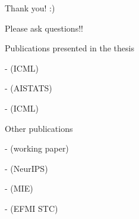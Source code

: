 \documentclass[17pt,aspectratio=169]{beamer}
\begin{document}
\begin{frame}

  \vspace{1.5em}

  \begin{center}
    \huge
    Thank you! :)

    \normalsize Please ask questions!!
  \end{center}


  \vspace{1em}

  \footnotesize
  Publications presented in the thesis

  \vspace{0.2em}

  \tiny
  -  (ICML)

  \vspace{0.2em}

  -  (AISTATS)

  \vspace{0.2em}

  -  (ICML)

  \vspace{1em}

  \footnotesize
  Other publications

  \vspace{0.2em}

  \tiny
  -  (working paper)

  \vspace{0.2em}

  -  (NeurIPS)

  \vspace{0.2em}

  -  (MIE)

  \vspace{0.2em}

  -  (EFMI STC)


\end{frame}
\end{document}
